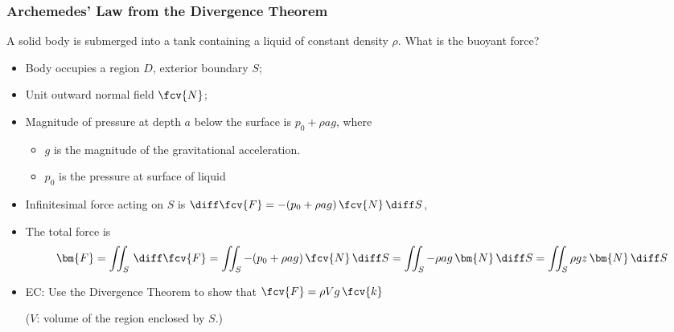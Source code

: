 \begin{frame}
  \frametitle{Archemedes' Law from the Divergence Theorem}

A solid body is submerged into a tank containing a liquid of constant density $\rho$. What is the buoyant force?

\begin{itemize}
  \item \pause Body occupies a region $D$, exterior boundary $S$;
  \item Unit outward normal field $\fcv{N}$;
  \item \pause Magnitude of pressure at depth $a$ below the surface is $p_0+\rho a g$, where
   \begin{itemize}
     \item $g$ is the magnitude of the gravitational acceleration.
     \item $p_0$ is the pressure at surface of liquid
   \end{itemize}
  \item \pause Infinitesimal force acting on $S$ is $\diff \fcv{F} = -(p_0+\rho a g) \, \fcv{N} \, \diff S$,
  \item  \pause The total force is
%
$$\bm{F} = \iint_S \, \diff \fcv{F} = \iint_S -(p_0+\rho a g) \, \fcv{N} \, \diff S = \iint_S -\rho a g \, \bm{N}\,\diff S = \iint_S \rho g z \, \bm{N}\,\diff S$$
%
\item \pause EC: Use the Divergence Theorem to show that $\fcv{F} = \rho V g \, \fcv{k}$

    ($V$: volume of the region enclosed by $S$.)

\end{itemize}

\end{frame}